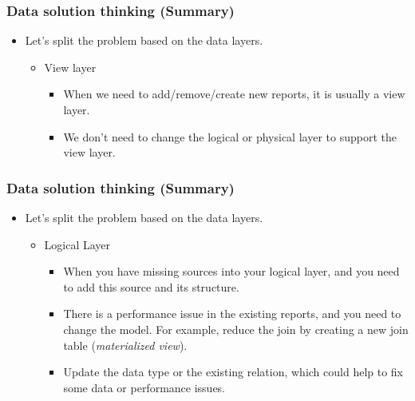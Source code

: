 
\begin{frame}
	\frametitle{Data solution thinking (Summary) }
	\begin{itemize}[<+->]
        \item Let's split the problem based on the data layers.
          \begin{itemize}[<+->]
          \item View layer
            \begin{itemize}[<+->]
            \item When we need to add/remove/create new reports, it is usually a view layer.
            \item We don't need to change the logical or physical layer to support the view layer.
          \end{itemize}
        \end{itemize}
       \end{itemize}
 \end{frame}

\begin{frame}
\frametitle{Data solution thinking (Summary) }
	\begin{itemize}[<+->]
        \item Let's split the problem based on the data layers.
          \begin{itemize}[<+->]
           \item Logical Layer
           \begin{itemize}[<+->]
             \item When you have missing sources into your logical layer, and you need to add this source and its structure.
             \item There is a performance issue in the existing reports, and you need to change the model. For example, reduce the join by creating a new join table (\textit{materialized view}).
             \item Update the data type or the existing relation, which could help to fix some data or performance issues.
            \end{itemize}
           \end{itemize}
        \end{itemize}
 \end{frame}

